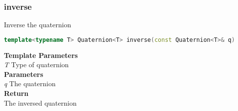\subsubsection{inverse}
\begin{mdframed}
Inverse the quaternion
\begin{lstlisting}[language=C++]
template<typename T> Quaternion<T> inverse(const Quaternion<T>& q) 
\end{lstlisting}
\textbf{Template Parameters} \\ 
\textit{T} Type of quaternion \\ 
\textbf{Parameters} \\ 
\textit{q} The quaternion \\ 
\textbf{Return} \\ 
The inversed quaternion\\ 
\end{mdframed}

